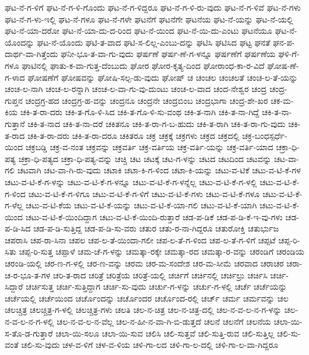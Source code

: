 {ಘಟ-ನೆ-ಗ-ಳಿಗೆ
ಘಟ-ನೆ-ಗ-ಳಿ-ಗೊಂದು
ಘಟ-ನೆ-ಗ-ಳಿದ್ದರೂ
ಘಟ-ನೆ-ಗ-ಳಿ-ರು-ವುದು
ಘಟ-ನೆ-ಗ-ಳಿವೆ
ಘಟ-ನೆ-ಗಳು
ಘಟ-ನೆ-ಗ-ಳು-ಇಲ್ಲಿ
ಘಟ-ನೆ-ಗಳೂ
ಘಟ-ನೆ-ಗಳೇ
ಘಟನೆಗೆ
ಘಟನೆಗೇ
ಘಟನೆಯ
ಘಟ-ನೆ-ಯನ್ನು
ಘಟ-ನೆ-ಯಲ್ಲಿ
ಘಟ-ನೆ-ಯಾ-ದರೋ
ಘಟ-ನೆ-ಯಾ-ದು-ದ-ರಿಂದ
ಘಟ-ನೆ-ಯಿಂದ
ಘಟ-ನೆ-ಯಿ-ದು-ಎಂಟು
ಘಟನೆಯೂ
ಘಟ-ನೆ-ಯೊಂದನ್ನು
ಘಟ-ನೆ-ಯೊಂದು
ಘಟಿ-ತ-ವಾದ
ಘಟಿ-ಸ-ಲಿಲ್ಲ-ಎಂಬು-ದನ್ನು
ಘಟಿಸಿ
ಘಟಿಸಿದ
ಘಟ್ಟ
ಘನತೆ
ಘನ-ಪ-ದಾರ್ಥ-ವಾ-ಗಿತ್ತೆಂದು
ಘನೀ-ಭೂ-ತ-ವಾ-ಗು-ವುದು
ಘರ್ಷಣೆ
ಘರ್ಷ-ಣೆ-ಗ-ಳನ್ನೂ
ಘರ್ಷಣೆಗೆ
ಘರ್ಷಣೆಯ
ಘಳಿ-ಗೆ-ಗಳೂ
ಘಾಟಿನಲ್ಲಿ
ಘಾತು-ಕ-ವಾ-ಗುತ್ತ-ದೆಂಬುದು
ಘೋರ
ಘೋರ-ಕೃತ್ಯ-ದಿಂದ
ಘೋರಾಂಧ-ಕಾ-ರ-ವಿದೆ
ಘೋಷ-ಣೆ-ಗ-ಳಾದ
ಘೋಷಣೆಗೆ
ಘೋಷವನ್ನು
ಘೋಷಿ-ಸಲ್ಪ-ಡು-ವುದು
ಘೋಷ್
ಚ
ಚಂಚಲ
ಚಂಚಲತೆ
ಚಂಚ-ಲ-ತೆ-ಯನ್ನು
ಚಂಚ-ಲ-ನಾಗಿ
ಚಂಚ-ಲ-ರನ್ನಾಗಿ
ಚಂಚ-ಲ-ವಾ-ಗು-ವು-ದುಂಟು
ಚಂಚ-ಲ-ವಾದ
ಚಂದ-ನೇಶ್ವರ
ಚಂದ್ರ
ಚಂದ್ರ-ಗುಪ್ತನ
ಚಂದ್ರಗ್ರ-ಹದ
ಚಂದ್ರಗ್ರ-ಹ-ವನ್ನು
ಚಂದ್ರನೂ
ಚಂದ್ರನೇ
ಚಂದ್ರಬಿಂಬ
ಚಂದ್ರಭಾಗಾ
ಚಂದ್ರ-ಶೇ-ಖರ
ಚಕ-ಮ-ಕಿಯ
ಚಕಿ-ತ-ರಾ-ದರು
ಚಕಿ-ತ-ಗೊ-ಳಿ-ಸಿದ
ಚಕಿ-ತ-ಗೊ-ಳಿ-ಸು-ವಂಥ
ಚಕಿ-ತ-ನಾಗಿ
ಚಕಿ-ತ-ನಾ-ಗಿದ್ದೆ
ಚಕಿ-ತ-ನಾ-ಗುತ್ತಾನೆ
ಚಕಿ-ತ-ನಾದ
ಚಕಿ-ತ-ನಾ-ದರೆ
ಚಕಿತನೂ
ಚಕಿ-ತ-ರಾ-ಗ-ಬ-ಹುದು
ಚಕಿ-ತ-ರಾಗಿ
ಚಕಿ-ತ-ರಾ-ಗು-ವುದು
ಚಕಿ-ತ-ರಾದ
ಚಕಿ-ತ-ರಾ-ದರು
ಚಕಿ-ತ-ರಾ-ದರೂ
ಚಕಿತರೂ
ಚಕ್ರ
ಚಕ್ರಕ್ಕೆ
ಚಕ್ರಗಳು
ಚಕ್ರದ
ಚಕ್ರದಲ್ಲಿ
ಚಕ್ರ-ಬಂಧಸ್ಪರ್ಧೆ-ಯಿಂದ
ಚಕ್ರಬಡ್ಡಿ
ಚಕ್ರ-ವ-ನಂತ
ಚಕ್ರವನ್ನು
ಚಕ್ರವರ್ತಿ
ಚಕ್ರ-ವರ್ತಿಯ
ಚಕ್ರ-ವರ್ತಿ-ಯನ್ನು
ಚಕ್ರ-ವರ್ತಿ-ಯಾದ
ಚಕ್ರಾ-ಧಿ-ಪತ್ಯ
ಚಕ್ರಾ-ಧಿ-ಪತ್ಯದ
ಚಕ್ರಾ-ಧಿ-ಪತ್ಯ-ವನ್ನು
ಚಚ್ಚಿ
ಚಟ
ಚಟಕ್ಕೆ
ಚಟ-ಗ-ಳನ್ನು
ಚಟದ
ಚಟದಿಂದ
ಚಟವನ್ನು
ಚಟ-ವಾ-ಗಲಿ
ಚಟವಾಗಿ
ಚಟ-ವಾ-ಗಿ-ರು-ವುದು
ಚಟಾಕಿ
ಚಟಾ-ಕಿ-ಗ-ಳಿಂದ
ಚಟಾ-ಕಿ-ಯನ್ನು
ಚಟು-ವ-ಟಿಕೆ
ಚಟು-ವ-ಟಿ-ಕೆ-ಗಳ
ಚಟು-ವ-ಟಿ-ಕೆ-ಗ-ಳನ್ನು
ಚಟು-ವ-ಟಿ-ಕೆ-ಗ-ಳನ್ನೂ
ಚಟು-ವ-ಟಿ-ಕೆ-ಗ-ಳನ್ನೆಲ್ಲ
ಚಟು-ವ-ಟಿ-ಕೆ-ಗ-ಳಲ್ಲಿ
ಚಟು-ವ-ಟಿ-ಕೆ-ಗ-ಳಿಂದ
ಚಟು-ವ-ಟಿ-ಕೆ-ಗ-ಳಿಗೂ
ಚಟು-ವ-ಟಿ-ಕೆ-ಗ-ಳಿಗೆ
ಚಟು-ವ-ಟಿ-ಕೆ-ಗಳು
ಚಟು-ವ-ಟಿ-ಕೆ-ಗಳೂ
ಚಟು-ವ-ಟಿ-ಕೆ-ಗ-ಳೆಲ್ಲ
ಚಟು-ವ-ಟಿ-ಕೆಯ
ಚಟು-ವ-ಟಿ-ಕೆ-ಯನ್ನು
ಚಟು-ವ-ಟಿ-ಕೆ-ಯಾ-ಗಲಿ
ಚಟು-ವ-ಟಿ-ಕೆ-ಯಾಗಿ
ಚಟು-ವ-ಟಿ-ಕೆ-ಯಿಂದ
ಚಟು-ವ-ಟಿ-ಕೆ-ಯಿಂದಿದ್ದಾಗ
ಚಟು-ವ-ಟಿ-ಕೆ-ಯಿಂದಿ-ರುತ್ತಾರೆ
ಚಡ-ಪ-ಡಿಕೆ
ಚಡ-ಪ-ಡಿ-ಕೆ-ಇ-ವು-ಗಳು
ಚಡ-ಪ-ಡಿ-ಸಿದ
ಚಡ-ಪ-ಡಿ-ಸುತ್ತಿದ್ದ
ಚಡ-ಪ-ಡಿ-ಸು-ವರು
ಚತುರ
ಚತು-ರ-ನಾ-ಗಿದ್ದರೂ
ಚತುರೋಕ್ತಿ
ಚತುರ್ಭುಜ
ಚಪರಾಸಿ
ಚಪ-ರಾ-ಸಿನಾ
ಚಪಲ
ಚಪ-ಲ-ತೆ-ಯಿಂದಾ-ಗಲೀ
ಚಪ-ಲ-ತೆ-ಗ-ಳಿಂದ
ಚಪ-ಲ-ತೆ-ಗ-ಳಿಗೆ
ಚಪ್ಪಟೆ
ಚಪ್ಪ-ರಿ-ಸಿತು
ಚಪ್ಪ-ರಿ-ಸುತ್ತ
ಚಪ್ಪಾಳೆ
ಚಮ-ಚೆ-ಗ-ಳನ್ನು
ಚಮತ್ಕಾ-ರಕ್ಕೇ
ಚಮತ್ಕಾ-ರದ
ಚಮತ್ಕಾ-ರ-ವನ್ನು
ಚರಂಡಿಗೆ
ಚರಂಡಿಯ
ಚರಂಡಿ-ಯಲ್ಲಿ
ಚರ-ಣ-ಗ-ಳಲ್ಲಿ
ಚರ-ಣ-ವನ್ನು
ಚರಮ
ಚರ-ಮ-ಸಂದೇಶ
ಚರ-ಮ-ಸೀಮೆ
ಚರವಾದ
ಚರಾಚರ
ಚರಾ-ಚ-ರ-ಭೂ-ತ-ಗಳ
ಚರಿ-ತ-ರಾದ
ಚರಿತ್ರೆ
ಚರಿತ್ರೆಯ
ಚರಿತ್ರೆ-ಯಲ್ಲಿ
ಚರ್ಚಿಗೆ
ಚರ್ಚಿನಲ್ಲಿ
ಚರ್ಚಿಲ್ರು
ಚರ್ಚಿಸಿ
ಚರ್ಚಿ-ಸಿದ್ದಾರೆ
ಚರ್ಚಿಸುತ್ತ
ಚರ್ಚಿ-ಸುತ್ತಿದ್ದಾಗ
ಚರ್ಚಿ-ಸು-ವುದು
ಚರ್ಚು-ಗ-ಳನ್ನು
ಚರ್ಚು-ಗ-ಳಲ್ಲಿ
ಚರ್ಚೆ
ಚರ್ಚೆಯನ್ನು
ಚರ್ಚೆಯಲ್ಲಿ
ಚರ್ಚೆಯಿಂದ
ಚರ್ಚೊಂದನ್ನು
ಚರ್ಚೊಂದರ
ಚರ್ಚೊಂದ-ರಲ್ಲಿ
ಚರ್ಚ್
ಚರ್ಮ
ಚರ್ಮವನ್ನು
ಚಲ
ಚಲಚ್ಚಿತ್ರ
ಚಲಚ್ಚಿತ್ರ-ಗ-ಳಲ್ಲಿ
ಚಲಚ್ಚಿತ್ರ-ಗಳು
ಚಲತಿ
ಚಲ-ನ-ಚಿತ್ರ
ಚಲ-ನ-ಚಿತ್ರ-ದಲ್ಲಿ
ಚಲ-ನ-ವ-ಲ-ನ-ಗ-ಳನ್ನು
ಚಲ-ನ-ವ-ಲ-ನ-ಗ-ಳಲ್ಲಿ
ಚಲ-ನ-ವ-ಲ-ನ-ವೆಲ್ಲ
ಚಲ-ನ-ಹೀ-ನ-ವಾ-ಗಿ-ಬಿ-ಡುತ್ತದೆ
ಚಲನೆ
ಚಲನೆಗೆ
ಚಲನೆಯ
ಚಲಾ-ಯಿ-ಸ-ತೊ-ಡ-ಗುತ್ತಾರೆ
ಚಲಾ-ಯಿ-ಸಲೂ
ಚಲಾ-ಯಿ-ಸುವ
ಚಲಿಸಿ
ಚಲಿ-ಸುತ್ತವೆ
ಚಲಿ-ಸುತ್ತಿ-ರುವ
ಚಲಿ-ಸುತ್ತಿಲ್ಲ
ಚಲಿ-ಸು-ವಂತೆ
ಚಲಿ-ಸು-ವುದು
ಚಳ-ವ-ಳಿಗೆ
ಚಳ-ವ-ಳಿಯ
ಚಳಿ-ಗಾ-ಲದ
ಚಳಿ-ಗಾ-ಲ-ದಲ್ಲಿ
ಚಳಿ-ಗಾ-ಲ-ವಾ-ಗಿದ್ದರೂ
}
